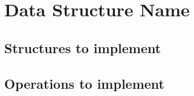 \section{Data Structure Name}


\subsection{Structures to implement}

\subsection{Operations to implement}

